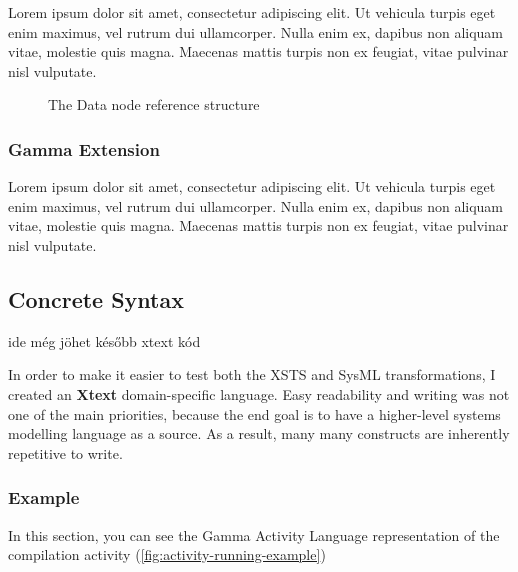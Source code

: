 Lorem ipsum dolor sit amet, consectetur adipiscing elit. Ut vehicula turpis eget enim maximus, vel rutrum dui ullamcorper. Nulla enim ex, dapibus non aliquam vitae, molestie quis magna. Maecenas mattis turpis non ex feugiat, vitae pulvinar nisl vulputate.

\begin{figure}[!ht]
	\centering
	
	\caption{The Data node reference structure}
	\label{fig:pin_reference}
\end{figure}

\subsubsection{Gamma Extension}

Lorem ipsum dolor sit amet, consectetur adipiscing elit. Ut vehicula turpis eget enim maximus, vel rutrum dui ullamcorper. Nulla enim ex, dapibus non aliquam vitae, molestie quis magna. Maecenas mattis turpis non ex feugiat, vitae pulvinar nisl vulputate.

\subsection{Concrete Syntax}

ide még jöhet később xtext kód

In order to make it easier to test both the XSTS and SysML transformations, I created an \textbf{Xtext} domain-specific language. Easy readability and writing was not one of the main priorities, because the end goal is to have a higher-level systems modelling language as a source. As a result, many many constructs are inherently repetitive to write.


\subsubsection{Example}

In this section, you can see the Gamma Activity Language representation of the compilation activity (\autoref{fig:activity-running-example})

